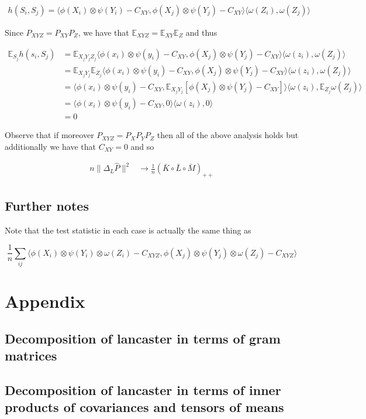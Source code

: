 \documentclass{article}
\begin{document}
\begin{align*}
h(S_i,S_j) = \langle\phi(X_i)\otimes \psi(Y_i) - C_{XY}, \phi(X_j)\otimes \psi(Y_j) - C_{XY}\rangle \langle \omega(Z_i),\omega(Z_j) \rangle
\end{align*}

Since $P_{XYZ} = P_{XY} P_Z$, we have that $\mathbb{E}_{XYZ}=\mathbb{E}_{XY}\mathbb{E}_{Z}$ and thus

\begin{align*}
\mathbb{E}_{S_j}h(s_i,S_j) &= \mathbb{E}_{X_jY_jZ_j}\langle\phi(x_i)\otimes \psi(y_i) - C_{XY}, \phi(X_j)\otimes \psi(Y_j) - C_{XY}\rangle \langle \omega(z_i),\omega(Z_j) \rangle \\&=
\mathbb{E}_{X_jY_j}\mathbb{E}_{Z_j}\langle\phi(x_i)\otimes \psi(y_i) - C_{XY}, \phi(X_j)\otimes \psi(Y_j) - C_{XY}\rangle \langle \omega(z_i),\omega(Z_j) \rangle \\&=
\langle\phi(x_i)\otimes \psi(y_i) - C_{XY},\mathbb{E}_{X_jY_j}[ \phi(X_j)\otimes \psi(Y_j) - C_{XY}]\rangle \langle \omega(z_i),\mathbb{E}_{Z_j}\omega(Z_j) \rangle \\&=
\langle\phi(x_i)\otimes \psi(y_i) - C_{XY},0\rangle \langle \omega(z_i),0 \rangle \\&= 0
\end{align*}

Observe that if moreover $P_{XYZ} = P_XP_YP_Z$ then all of the above analysis holds but additionally we have that $C_{XY} = 0$ and so 

\begin{align*}
n\|\Delta_L \hat{P}\|^2 &\longrightarrow \frac{1}{n}(\bar{K}\circ \bar{L} \circ \bar{M})_{++}
\end{align*}

\subsection*{Further notes}

Note that the test statistic in each case is actually the same thing as

\[
\frac{1}{n} \sum_{ij} \langle\phi(X_i)\otimes \psi(Y_i) \otimes\omega(Z_i) - C_{XYZ}, \phi(X_j)\otimes \psi(Y_j)\otimes\omega(Z_j) - C_{XYZ}\rangle
\]

\section{Appendix}
\subsection{Decomposition of lancaster in terms of gram matrices}
\subsection{Decomposition of lancaster in terms of inner products of covariances and tensors of means}
\end{document}
